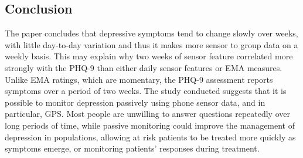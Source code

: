 \subsection{Conclusion}
The paper concludes that depressive symptoms tend to change slowly over weeks, with little day-to-day variation and thus it makes more sensor to group data on a weekly basis. This may explain why two weeks of sensor feature correlated more strongly with the PHQ-9 than either daily sensor features or EMA measures. Unlike EMA ratings, which are momentary, the PHQ-9 assessment reports symptoms over a period of two weeks. The study conducted suggests that it is possible to monitor depression passively using phone sensor data, and in particular, GPS. Most people are unwilling to answer questions repeatedly over long periods of time, while passive monitoring could improve the management of depression in populations, allowing at risk patients to be treated more quickly as symptoms emerge, or monitoring patients’ responses during treatment.